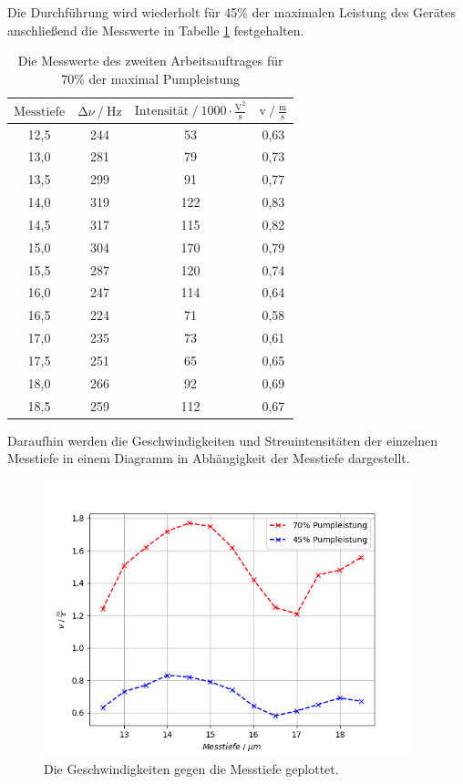 \begin{flushleft}
    Die Durchführung wird wiederholt für 45\% der maximalen Leistung des Gerätes anschließend die Messwerte in Tabelle \ref{Tabelle7} festgehalten.
\end{flushleft}

\begin{table}[H]
    \centering
    \caption{Die Messwerte des zweiten Arbeitsauftrages für 70\% der maximal Pumpleistung} 
    \label{Tabelle7}
    \begin{tabular} {c  c  c  c}
        \toprule
        {$ \text{Messtiefe} $} &
        {$ \increment \nu \mathbin{/} \unit{\hertz} $} &
        {$ \text{Intensität} \mathbin{/} 1000 \cdot \frac{\text{V}^2}{\unit{\second}} $} &
        {$ \text{v} \mathbin{/} \frac{\text{m}}{\text{s}} $} \\
        \midrule
        12,5 & 244 & 53  & 0,63 \\
        13,0 & 281 & 79  & 0,73 \\
        13,5 & 299 & 91  & 0,77 \\
        14,0 & 319 & 122 & 0,83 \\
        14,5 & 317 & 115 & 0,82 \\
        15,0 & 304 & 170 & 0,79 \\
        15,5 & 287 & 120 & 0,74 \\
        16,0 & 247 & 114 & 0,64 \\
        16,5 & 224 & 71  & 0,58 \\
        17,0 & 235 & 73  & 0,61 \\
        17,5 & 251 & 65  & 0,65 \\
        18,0 & 266 & 92  & 0,69 \\
        18,5 & 259 & 112 & 0,67 \\
        \bottomrule
    \end{tabular} 
\end{table}

\begin{flushleft}
    Daraufhin werden die Geschwindigkeiten und Streuintensitäten der einzelnen Messtiefe in einem Diagramm in Abhängigkeit der Messtiefe dargestellt.
\end{flushleft}

\begin{figure}[H]
    \centering
    \includegraphics[height=80mm]{bilder/Plot3.png}
    \caption{Die Geschwindigkeiten gegen die Messtiefe geplottet.\label{Abbildung3} }
\end{figure}

